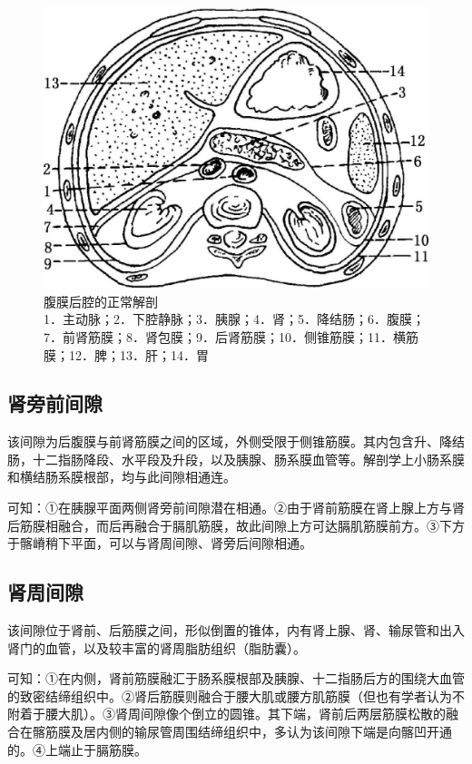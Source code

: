 \begin{figure}[!htbp]
 \centering
 \includegraphics[width=.7\textwidth,height=\textheight,keepaspectratio]{./images/Image00381.jpg}
 \captionsetup{justification=centering}
 \caption{腹膜后腔的正常解剖\\{\small 1．主动脉；2．下腔静脉；3．胰腺；4．肾；5．降结肠；6．腹膜；7．前肾筋膜；8．肾包膜；9．后肾筋膜；10．侧锥筋膜；11．横筋膜；12．脾；13．肝；14．胃}}
 \label{fig19-1}
  \end{figure} 

\subsection{肾旁前间隙}

该间隙为后腹膜与前肾筋膜之间的区域，外侧受限于侧锥筋膜。其内包含升、降结肠，十二指肠降段、水平段及升段，以及胰腺、肠系膜血管等。解剖学上小肠系膜和横结肠系膜根部，均与此间隙相通连。

可知：①在胰腺平面两侧肾旁前间隙潜在相通。②由于肾前筋膜在肾上腺上方与肾后筋膜相融合，而后再融合于膈肌筋膜，故此间隙上方可达膈肌筋膜前方。③下方于髂嵴稍下平面，可以与肾周间隙、肾旁后间隙相通。

\subsection{肾周间隙}

该间隙位于肾前、后筋膜之间，形似倒置的锥体，内有肾上腺、肾、输尿管和出入肾门的血管，以及较丰富的肾周脂肪组织（脂肪囊）。

可知：①在内侧，肾前筋膜融汇于肠系膜根部及胰腺、十二指肠后方的围绕大血管的致密结缔组织中。②肾后筋膜则融合于腰大肌或腰方肌筋膜（但也有学者认为不附着于腰大肌）。③肾周间隙像个倒立的圆锥。其下端，肾前后两层筋膜松散的融合在髂筋膜及居内侧的输尿管周围结缔组织中，多认为该间隙下端是向髂凹开通的。④上端止于膈筋膜。

